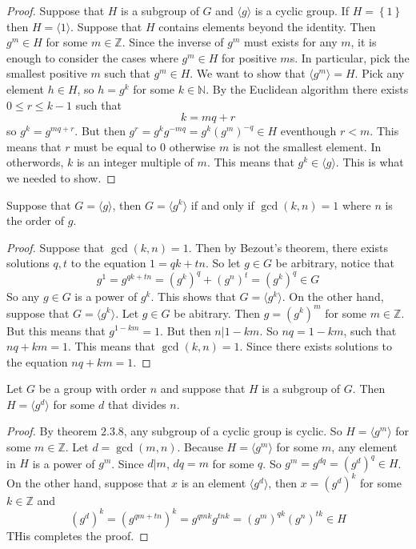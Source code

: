 \documentclass{article}
\begin{document}
\begin{proof}
    Suppose that $H$ is a subgroup of $G$ and $\langle g \rangle$ is a cyclic group. If $H=\left\{ 1 \right\}$ then $H=\langle 1 \rangle$. Suppose that $H$ 
    contains elements beyond the identity. Then $g^m\in H$ for some $m\in \mathbb{Z}$. Since the inverse of $g^m$ must exists for any $m$, it is enough to consider the cases where $g^m\in H$ for positive $m$s.
    In particular, pick the smallest positive $m$ such that $g^m\in H$. We want to show that $\langle g^m \rangle = H$. Pick any element $h\in H$, 
    so $h=g^k$ for some $k\in \mathbb{N}$. By the Euclidean algorithm there exists $0\leq r\leq k-1$ such that
    \[
    k=mq+r 
    \]
    so $g^k=g^{mq+r}$. But then $g^r =g^kg^{-mq}=g^k(g^{m})^{-q}\in H$ eventhough $r< m$. This means that $r$ must be equal to $0$ otherwise $m$ is not the smallest element. In otherwords, $k$ is an integer 
    multiple of $m$. This means that $g^k\in \langle g \rangle$. This is what we needed to show.

\end{proof}
\begin{theorem}
    Suppose that $G=\langle g \rangle$, then $G=\langle g^k \rangle$ if and only if $\gcd(k,n)=1$ where $n$ is the order of $g$.
\end{theorem}
\begin{proof}
      Suppose that $\gcd(k, n)=1$. Then by Bezout's theorem, there exists solutions $q,t$ to the equation $1=qk+tn$. So let $g\in G$ be arbitrary, notice that 
      \[
      g^1 = g^{qk+tn}= (g^k)^q+(g^n)^t = (g^k)^q \in G
      \]
      So any $g\in G$ is a power of $g^k$. This shows that $G=\langle g^k \rangle$. On the other hand, suppose that 
$G= \langle g^k \rangle$. Let $g\in G$ be abitrary. Then $g=(g^k)^m$ for some $m\in \mathbb{Z}$. But this means that $g^{1-km}=1$. But then $n|1-km$. So $nq =1-km$, such that $nq+km=1$. 
This means that $\gcd(k,n)=1$. Since there exists solutions to the equation $nq+km=1$.
\end{proof}
\begin{theorem}
    Let $G$ be a group with order $n$ and 
    suppose that $H$ is a subgroup of $G$. Then $H=\langle g^d \rangle$ for some $d$ that divides $n$.
\end{theorem}
\begin{proof}
    By theorem $2.3.8$, any subgroup of a cyclic group is cyclic. So $H=\langle g^m \rangle$ for some $m\in \mathbb{Z}$. Let 
    $d=\gcd(m,n)$. Because $H=\langle g^m \rangle$ for some $m$, any element in $H$ is a power of $g^m$. Since $d|m$, $dq=m$ for some $q$. So $g^m= g^{dq}=(g^d)^q\in H$.
    On the other hand, suppose that $x$ is an element $\langle g^d\rangle$, then $x=(g^d)^k$ for some $k \in \mathbb{Z}$ and  
    \[
    (g^d)^k= (g^{qm+tn})^k=g^{qmk}g^{tnk}= (g^{m})^{qk}(g^n)^{tk}\in H
    \]
    THis completes the proof.
\end{proof}
\end{document}

